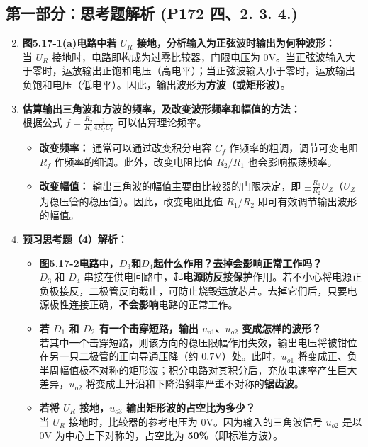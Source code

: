 ﻿\documentclass[10.5pt]{config}
\begin{document}
\subsection*{第一部分：思考题解析 (P172 四、2. 3. 4.)}
\begin{enumerate}[label=\arabic*., leftmargin=2em]
    \setcounter{enumi}{1}
    \item \textbf{图5.17-1(a)电路中若 $U_R$ 接地，分析输入为正弦波时输出为何种波形：} \\
    当 $U_R$ 接地时，电路即构成为过零比较器，门限电压为 $0\mathrm{V}$。当正弦波输入大于零时，运放输出正饱和电压（高电平）；当正弦波输入小于零时，运放输出负饱和电压（低电平）。因此，输出波形为\textbf{方波（或矩形波）}。
    
    \item \textbf{估算输出三角波和方波的频率，及改变波形频率和幅值的方法：} \\
    根据公式 $f = \frac{R_2}{R_1} \frac{1}{4 R_f C_f}$ 可以估算理论频率。
    \begin{itemize}
        \item \textbf{改变频率：} 通常可以通过改变积分电容 $C_f$ 作频率的粗调，调节可变电阻 $R_f$ 作频率的细调。此外，改变电阻比值 $R_2/R_1$ 也会影响振荡频率。
        \item \textbf{改变幅值：} 输出三角波的幅值主要由比较器的门限决定，即 $\pm \frac{R_1}{R_2}U_Z$（$U_Z$ 为稳压管的稳压值）。因此，改变电阻比值 $R_1/R_2$ 即可有效调节输出波形的幅值。
    \end{itemize}

    \item \textbf{预习思考题（4）解析：}
    \begin{itemize}
        \item [(1)] \textbf{图5.17-2电路中，$D_3$和$D_4$起什么作用？去掉会影响正常工作吗？} \\
        $D_3$ 和 $D_4$ 串接在供电回路中，起\textbf{电源防反接保护}作用。若不小心将电源正负极接反，二极管反向截止，可防止烧毁运放芯片。去掉它们后，只要电源极性连接正确，\textbf{不会影响}电路的正常工作。
        \item [(2)] \textbf{若 $D_1$ 和 $D_2$ 有一个击穿短路，输出 $u_{o1}$、$u_{o2}$ 变成怎样的波形？} \\
        若其中一个击穿短路，则该方向的稳压限幅作用失效，输出电压将被钳位在另一只二极管的正向导通压降（约 $0.7\mathrm{V}$）处。此时，$u_{o1}$ 将变成正、负半周幅值极不对称的矩形波；积分电路对其积分后，充放电速率产生巨大差异，$u_{o2}$ 将变成上升沿和下降沿斜率严重不对称的\textbf{锯齿波}。
        \item [(3)] \textbf{若将 $U_R$ 接地，$u_{o3}$ 输出矩形波的占空比为多少？} \\
        当 $U_R$ 接地时，比较器的参考电压为 $0\mathrm{V}$。因为输入的三角波信号 $u_{o2}$ 是以 $0\mathrm{V}$ 为中心上下对称的，占空比为 \textbf{50\%}（即标准方波）。
    \end{itemize}
\end{enumerate}
\end{document}
